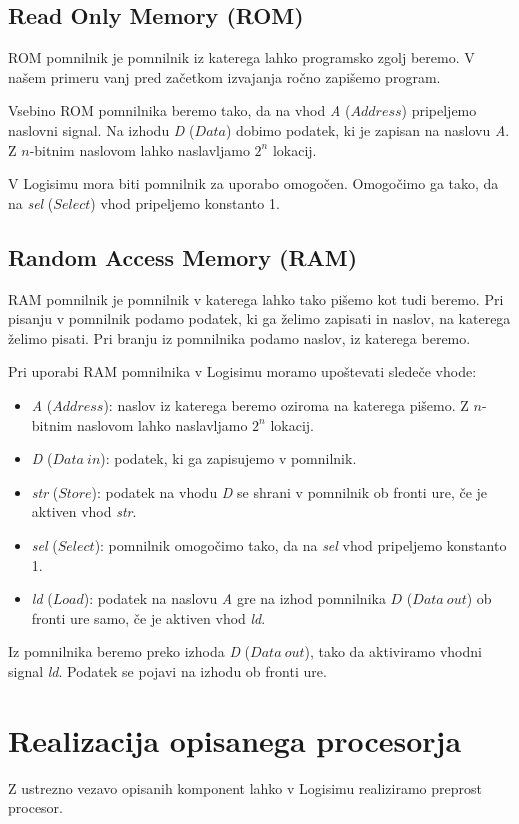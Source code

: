 \subsection{Read Only Memory (ROM)}
ROM pomnilnik je pomnilnik iz katerega lahko programsko zgolj beremo. V našem primeru vanj pred začetkom izvajanja ročno zapišemo program. 

Vsebino ROM pomnilnika beremo tako, da na vhod \emph{A} ($Address$) pripeljemo naslovni signal. Na izhodu \emph{D} ($Data$) dobimo podatek, ki je zapisan na naslovu \emph{A}. Z $n$-bitnim naslovom lahko naslavljamo $2^n$ lokacij. 

V Logisimu mora biti pomnilnik za uporabo omogočen. Omogočimo ga tako, da na \emph{sel} ($Select$) vhod pripeljemo konstanto 1. 

\subsection{Random Access Memory (RAM)}
RAM pomnilnik je pomnilnik v katerega lahko tako pišemo kot tudi beremo. Pri pisanju v pomnilnik podamo podatek, ki ga želimo zapisati in naslov, na katerega želimo pisati. Pri branju iz pomnilnika podamo naslov, iz katerega beremo.

Pri uporabi RAM pomnilnika v Logisimu moramo upoštevati sledeče vhode:
\begin{itemize}
\item \emph{A} ($Address$): naslov iz katerega beremo oziroma na katerega pišemo. Z $n$-bitnim naslovom lahko naslavljamo $2^n$ lokacij.
\item \emph{D} ($Data\ in$): podatek, ki ga zapisujemo v pomnilnik.
\item \emph{str} ($Store$): podatek na vhodu \emph{D} se shrani v pomnilnik ob fronti ure, če je aktiven vhod \emph{str}.
\item \emph{sel} ($Select$): pomnilnik omogočimo tako, da na \emph{sel} vhod pripeljemo konstanto 1.
\item \emph{ld} ($Load$): podatek na naslovu \emph{A} gre na izhod pomnilnika $D$ ($Data\ out$) ob fronti ure samo, če je aktiven vhod \emph{ld}.
\end{itemize}
Iz pomnilnika beremo preko izhoda \emph{D} ($Data\ out$), tako da aktiviramo vhodni signal \emph{ld}. Podatek se pojavi na izhodu ob fronti ure.

\section{Realizacija opisanega procesorja}
Z ustrezno vezavo opisanih komponent lahko v Logisimu realiziramo preprost procesor.

